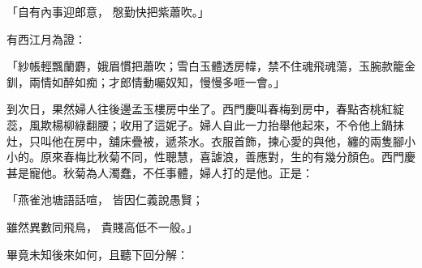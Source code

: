 \begin{showcontents}{}
「自有內事迎郎意，  慇勤快把紫蕭吹。」

有西江月為證：

「紗帳輕飄蘭麝，娥眉慣把蕭吹；雪白玉體透房幃，禁不住魂飛魂蕩，玉腕款籠金釧，兩情如醉如痴；才郎情動囑奴知，慢慢多咂一會。」

到次日，果然婦人往後邊孟玉樓房中坐了。西門慶叫春梅到房中，春點杏桃紅綻蕊，風欺楊柳綠翻腰；收用了這妮子。婦人自此一力抬舉他起來，不令他上鍋抹灶，只叫他在房中，舖床疊被，遞茶水。衣服首飾，揀心愛的與他，纏的兩隻腳小小的。原來春梅比秋菊不同，性聰慧，喜謔浪，善應對，生的有幾分顏色。西門慶甚是寵他。秋菊為人濁蠢，不任事體，婦人打的是他。正是：

「燕雀池塘語話喧，  皆因仁義說愚賢；

雖然異數同飛鳥，  貴賤高低不一般。」

畢竟未知後來如何，且聽下回分解：




\end{showcontents}
